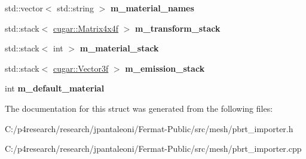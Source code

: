 \begin{DoxyCompactItemize}
std\+::vector$<$ std\+::string $>$ {\bfseries m\+\_\+material\+\_\+names}
\item 
\mbox{\label{structpbrt_1_1_fermat_importer_ad41f415f2786bce281d50dc98be136cb}} 
std\+::stack$<$ \hyperlink{structcugar_1_1_matrix}{cugar\+::\+Matrix4x4f} $>$ {\bfseries m\+\_\+transform\+\_\+stack}
\item 
\mbox{\label{structpbrt_1_1_fermat_importer_a7c2690b8b567bcd0ec24395a669584cd}} 
std\+::stack$<$ int $>$ {\bfseries m\+\_\+material\+\_\+stack}
\item 
\mbox{\label{structpbrt_1_1_fermat_importer_af008c7132624c12640996fc8bfa78927}} 
std\+::stack$<$ \hyperlink{structcugar_1_1_vector}{cugar\+::\+Vector3f} $>$ {\bfseries m\+\_\+emission\+\_\+stack}
\item 
\mbox{\label{structpbrt_1_1_fermat_importer_acda30e25bf58809c0203e901359bc169}} 
int {\bfseries m\+\_\+default\+\_\+material}
\end{DoxyCompactItemize}


The documentation for this struct was generated from the following files\+:\begin{DoxyCompactItemize}
\item 
C\+:/p4research/research/jpantaleoni/\+Fermat-\/\+Public/src/mesh/pbrt\+\_\+importer.\+h\item 
C\+:/p4research/research/jpantaleoni/\+Fermat-\/\+Public/src/mesh/pbrt\+\_\+importer.\+cpp\end{DoxyCompactItemize}
